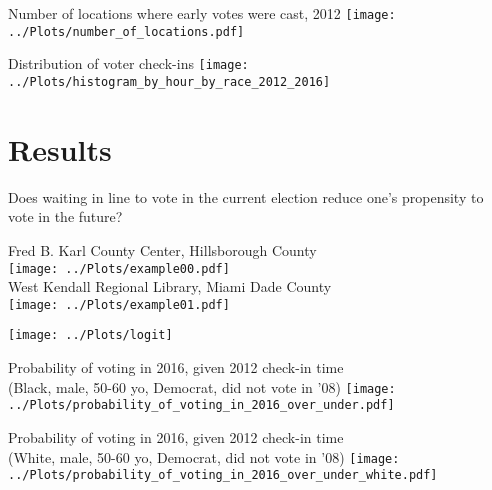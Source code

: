 \documentclass{beamer}
\begin{document}
		\begin{frame}				
		\centering 
		Number of locations where early votes were cast, 2012
		\texttt{[image: ../Plots/number\_of\_locations.pdf]}
		\end{frame}
		
		\begin{frame}				
			\centering 
			Distribution of voter check-ins
		\texttt{[image: ../Plots/histogram\_by\_hour\_by\_race\_2012\_2016]}
		\end{frame}


		
		
		
		\section{Results}
	
		\begin{frame}
		Does waiting in line to vote in the current election reduce one's propensity to vote in the future?
		\end{frame}

		\begin{frame}				
			\centering 
			Fred B. Karl County Center, Hillsborough County\\
			\texttt{[image: ../Plots/example00.pdf]} \\
			West Kendall Regional Library, Miami Dade County\\
			\texttt{[image: ../Plots/example01.pdf]} \\ 
		\end{frame}
	
		\begin{frame}
		\centering 
		\texttt{[image: ../Plots/logit]}			
		\end{frame}

		\begin{frame}				
			\centering
			Probability of voting in 2016, given 2012 check-in time \\
			(Black, male, 50-60 yo, Democrat, did not vote in '08)
			\texttt{[image: ../Plots/probability\_of\_voting\_in\_2016\_over\_under.pdf]}
		\end{frame}
		
		
		\begin{frame}				
			\centering
			Probability of voting in 2016, given 2012 check-in time \\
			(White, male, 50-60 yo, Democrat, did not vote in '08)
			\texttt{[image: ../Plots/probability\_of\_voting\_in\_2016\_over\_under\_white.pdf]}
		\end{frame}
		
\end{document}
